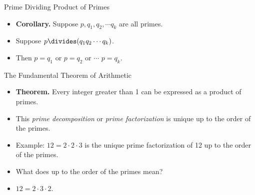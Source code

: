 \documentclass[handout]{beamer}
\begin{document}


\begin{frame}{Prime Dividing Product of Primes}

\begin{itemize}
  \item \textbf{Corollary.} Suppose $p, q_1, q_2, \cdots q_k$ are all primes.
  \item Suppose $p \divides (q_1 q_2 \cdots q_k)$.
  \item Then $p = q_1$ or $p=q_2$ or $\cdots$ $p=q_k$.
\end{itemize}
\end{frame}




\begin{frame}{The Fundamental Theorem of Arithmetic}

\begin{itemize}
  \item \textbf{Theorem.} Every integer greater than 1 can be expressed as a product of primes.
  \item This \emph{prime decomposition} or \emph{prime factorization} is unique up to the order of the primes.
  \item Example: $12 = 2\cdot 2 \cdot 3$ is the unique prime factorization of 12 up to the order of the primes.
  \item What does up to the order of the primes mean?
  \item $12 = 2 \cdot 3 \cdot 2$.
\end{itemize}

\end{frame}
\end{document}
